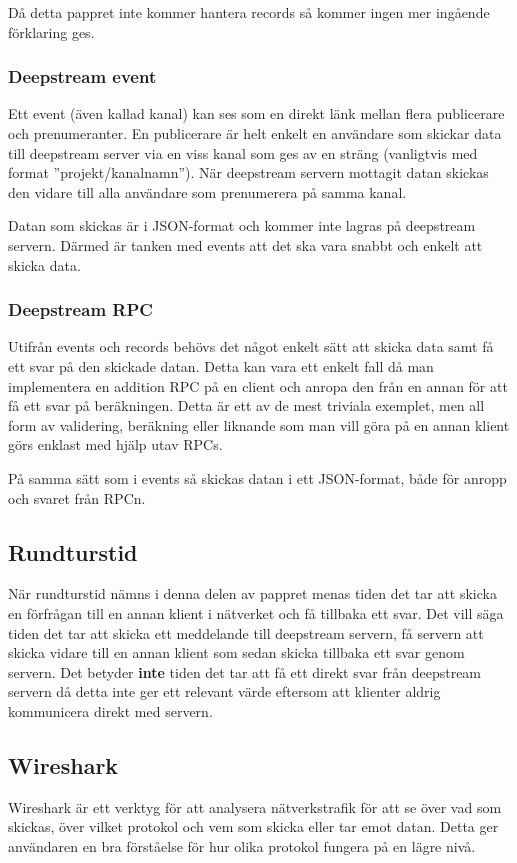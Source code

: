 Då detta pappret inte kommer hantera records så kommer ingen mer ingående förklaring ges\cite{ds-storingdata}.

\subsubsection{Deepstream event}
Ett event (även kallad kanal) kan ses som en direkt länk mellan flera publicerare och prenumeranter. En publicerare är helt enkelt en användare som skickar data till deepstream server via en viss kanal som ges av en sträng (vanligtvis med format ''projekt/kanalnamn''). När deepstream servern mottagit datan skickas den vidare till alla användare som prenumerera på samma kanal. 

Datan som skickas är i JSON-format och kommer inte lagras på deepstream servern. Därmed är tanken med events att det ska vara snabbt och enkelt att skicka data. 

\subsubsection{Deepstream RPC}
Utifrån events och records behövs det något enkelt sätt att skicka data samt få ett svar på den skickade datan. Detta kan vara ett enkelt fall då man implementera en addition RPC på en client och anropa den från en annan för att få ett svar på beräkningen. Detta är ett av de mest triviala exemplet, men all form av validering, beräkning eller liknande som man vill göra på en annan klient görs enklast med hjälp utav RPCs.

På samma sätt som i events så skickas datan i ett JSON-format, både för anropp och svaret från RPCn.

\subsection{Rundturstid}
När rundturstid nämns i denna delen av pappret menas tiden det tar att skicka en förfrågan till en annan klient i nätverket och få tillbaka ett svar. Det vill säga tiden det tar att skicka ett meddelande till deepstream servern, få servern att skicka vidare till en annan klient som sedan skicka tillbaka ett svar genom servern. Det betyder \textbf{inte} tiden det tar att få ett direkt svar från deepstream servern då detta inte ger ett relevant värde eftersom att klienter aldrig kommunicera direkt med servern.

\subsection{Wireshark}
Wireshark är ett verktyg för att analysera nätverkstrafik för att se över vad som skickas, över vilket protokol och vem som skicka eller tar emot datan. Detta ger användaren en bra förståelse för hur olika protokol fungera på en lägre nivå.

